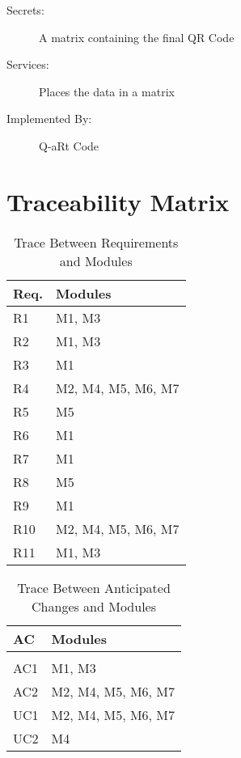 \documentclass[12pt, titlepage]{article}
\begin{document}
\begin{description}
\item[Secrets:] A matrix containing the final QR Code
\item[Services:] Places the data in a matrix
\item[Implemented By:] Q-aRt Code
\end{description}

\section{Traceability Matrix} \label{SecTM}


\begin{table}[H]
\centering
\begin{tabular}{p{} p{}}
\toprule
\textbf{Req.} & \textbf{Modules}\\
\midrule
R1 & M1, M3\\
R2 & M1, M3\\
R3 & M1\\
R4 & M2, M4, M5, M6, M7\\
R5 & M5\\
R6 & M1\\
R7 & M1\\
R8 & M5\\
R9 & M1\\
R10 & M2, M4, M5, M6, M7\\
R11 & M1, M3\\
\bottomrule
\end{tabular}
\caption{Trace Between Requirements and Modules}
\label{TblRT}
\end{table}

\begin{table}[H]
\centering
\begin{tabular}{p{} p{}}
\toprule
\textbf{AC} & \textbf{Modules}\\
\midrule
\\
AC1 & M1, M3\\ %
AC2 & M2, M4, M5, M6, M7\\
UC1 & M2, M4, M5, M6, M7\\
UC2 & M4\\
\bottomrule
\end{tabular}
\caption{Trace Between Anticipated Changes and Modules}
\label{TblACT}
\end{table}
\end{document}
